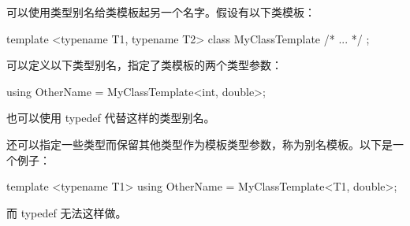 可以使用类型别名给类模板起另一个名字。假设有以下类模板：

\begin{cpp}
template <typename T1, typename T2>
class MyClassTemplate { /* ... */ };
\end{cpp}

可以定义以下类型别名，指定了类模板的两个类型参数：

\begin{cpp}
using OtherName = MyClassTemplate<int, double>;
\end{cpp}

也可以使用 typedef 代替这样的类型别名。

还可以指定一些类型而保留其他类型作为模板类型参数，称为别名模板。以下是一个例子：

\begin{cpp}
template <typename T1>
using OtherName = MyClassTemplate<T1, double>;
\end{cpp}

而 typedef 无法这样做。









